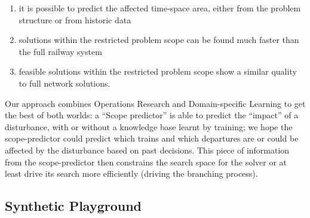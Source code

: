 \documentclass{article}
\begin{document}
\begin{enumerate}
\item it is possible to predict the affected time-space area, either from the problem structure or from historic data
\item solutions within the restricted problem scope can be found much faster than the full railway system
\item feasible solutions within the restricted problem scope show a similar quality to full network solutions.
\end{enumerate}


Our approach combines Operations Research and Domain-specific Learning to get the best of both worlds: a ``Scope predictor'' is able to predict the ``impact'' of a disturbance, with or without a knowledge base learnt by training; we hope the scope-predictor could predict which trains and which departures are or could be affected by the disturbance based on past decisions. This piece of information from the scope-predictor then constrains the search space for the solver or at least drive its search more efficiently (driving the branching process).

\subsection{Synthetic Playground}\label{subsec:playground}
\end{document}
